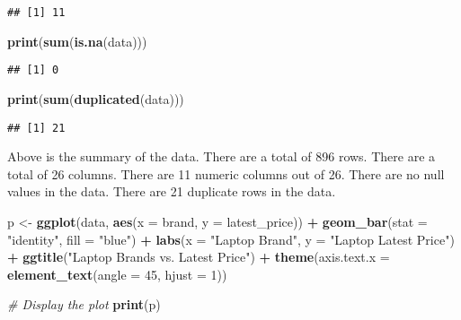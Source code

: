 \documentclass[
]{article}
\newenvironment{Shaded}{\begin{snugshade}}{\end{snugshade}}
\newcommand{\AttributeTok}[1]{\textcolor[rgb]{0.13,0.29,0.53}{#1}}
\newcommand{\CommentTok}[1]{\textcolor[rgb]{0.56,0.35,0.01}{\textit{#1}}}
\newcommand{\DecValTok}[1]{\textcolor[rgb]{0.00,0.00,0.81}{#1}}
\newcommand{\FunctionTok}[1]{\textcolor[rgb]{0.13,0.29,0.53}{\textbf{#1}}}
\newcommand{\NormalTok}[1]{#1}
\newcommand{\OtherTok}[1]{\textcolor[rgb]{0.56,0.35,0.01}{#1}}
\newcommand{\SpecialCharTok}[1]{\textcolor[rgb]{0.81,0.36,0.00}{\textbf{#1}}}
\newcommand{\StringTok}[1]{\textcolor[rgb]{0.31,0.60,0.02}{#1}}
\begin{document}
\begin{verbatim}
## [1] 11
\end{verbatim}

\begin{Shaded}
\begin{Highlighting}[]
\FunctionTok{print}\NormalTok{(}\FunctionTok{sum}\NormalTok{(}\FunctionTok{is.na}\NormalTok{(data)))}
\end{Highlighting}
\end{Shaded}

\begin{verbatim}
## [1] 0
\end{verbatim}

\begin{Shaded}
\begin{Highlighting}[]
\FunctionTok{print}\NormalTok{(}\FunctionTok{sum}\NormalTok{(}\FunctionTok{duplicated}\NormalTok{(data)))}
\end{Highlighting}
\end{Shaded}

\begin{verbatim}
## [1] 21
\end{verbatim}

Above is the summary of the data. There are a total of 896 rows. There
are a total of 26 columns. There are 11 numeric columns out of 26. There
are no null values in the data. There are 21 duplicate rows in the data.

\begin{Shaded}
\begin{Highlighting}[]
\NormalTok{p }\OtherTok{\textless{}{-}} \FunctionTok{ggplot}\NormalTok{(data, }\FunctionTok{aes}\NormalTok{(}\AttributeTok{x =} \StringTok{\textasciigrave{}}\AttributeTok{brand}\StringTok{\textasciigrave{}}\NormalTok{, }\AttributeTok{y =} \StringTok{\textasciigrave{}}\AttributeTok{latest\_price}\StringTok{\textasciigrave{}}\NormalTok{)) }\SpecialCharTok{+}
  \FunctionTok{geom\_bar}\NormalTok{(}\AttributeTok{stat =} \StringTok{"identity"}\NormalTok{, }\AttributeTok{fill =} \StringTok{"blue"}\NormalTok{) }\SpecialCharTok{+}
  \FunctionTok{labs}\NormalTok{(}\AttributeTok{x =} \StringTok{"Laptop Brand"}\NormalTok{, }\AttributeTok{y =} \StringTok{"Laptop Latest Price"}\NormalTok{) }\SpecialCharTok{+}
  \FunctionTok{ggtitle}\NormalTok{(}\StringTok{"Laptop Brands vs. Latest Price"}\NormalTok{) }\SpecialCharTok{+}
  \FunctionTok{theme}\NormalTok{(}\AttributeTok{axis.text.x =} \FunctionTok{element\_text}\NormalTok{(}\AttributeTok{angle =} \DecValTok{45}\NormalTok{, }\AttributeTok{hjust =} \DecValTok{1}\NormalTok{))}

\CommentTok{\# Display the plot}
\FunctionTok{print}\NormalTok{(p)}
\end{Highlighting}
\end{Shaded}
\end{document}
